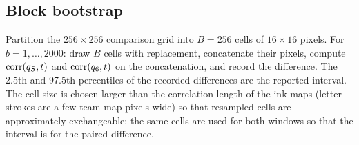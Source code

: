 \subsection{Block bootstrap}
\label{app:bootstrap}
Partition the $256\times256$ comparison grid into $B=256$ cells of $16\times16$ pixels. For $b=1,\dots,2000$: draw $B$ cells with replacement, concatenate their pixels, compute $\operatorname{corr}(q_S,t)$ and $\operatorname{corr}(q_6,t)$ on the concatenation, and record the difference. The 2.5th and 97.5th percentiles of the recorded differences are the reported interval. The cell size is chosen larger than the correlation length of the ink maps (letter strokes are a few team-map pixels wide) so that resampled cells are approximately exchangeable; the same cells are used for both windows so that the interval is for the paired difference.
